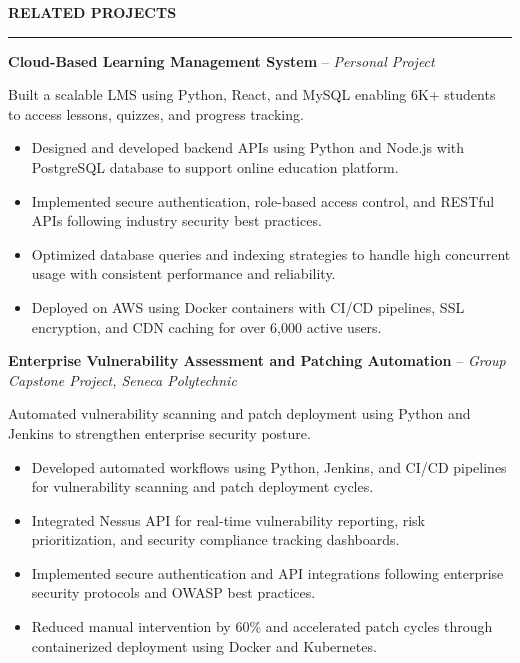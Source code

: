\documentclass[10pt,letterpaper]{article}
\begin{document}
\vspace{6pt}

\textbf{RELATED PROJECTS}\\[-8pt]
\noindent\rule{\textwidth}{1pt}

\vspace{-2pt}

\textbf{Cloud-Based Learning Management System} -- \emph{Personal Project}

\vspace{-1pt}

Built a scalable LMS using Python, React, and MySQL enabling 6K+ students to access lessons, quizzes, and progress tracking.
\vspace{-1pt}
\begin{itemize}
\item Designed and developed backend APIs using Python and Node.js with PostgreSQL database to support online education platform.
\item Implemented secure authentication, role-based access control, and RESTful APIs following industry security best practices.
\item Optimized database queries and indexing strategies to handle high concurrent usage with consistent performance and reliability.
\item Deployed on AWS using Docker containers with CI/CD pipelines, SSL encryption, and CDN caching for over 6,000 active users.
\end{itemize}

\textbf{Enterprise Vulnerability Assessment and Patching Automation} -- \emph{Group Capstone Project, Seneca Polytechnic}

\vspace{-1pt}

Automated vulnerability scanning and patch deployment using Python and Jenkins to strengthen enterprise security posture.
\vspace{-1pt}
\begin{itemize}
\item Developed automated workflows using Python, Jenkins, and CI/CD pipelines for vulnerability scanning and patch deployment cycles.
\item Integrated Nessus API for real-time vulnerability reporting, risk prioritization, and security compliance tracking dashboards.
\item Implemented secure authentication and API integrations following enterprise security protocols and OWASP best practices.
\item Reduced manual intervention by 60\% and accelerated patch cycles through containerized deployment using Docker and Kubernetes.
\end{itemize}
\end{document}
